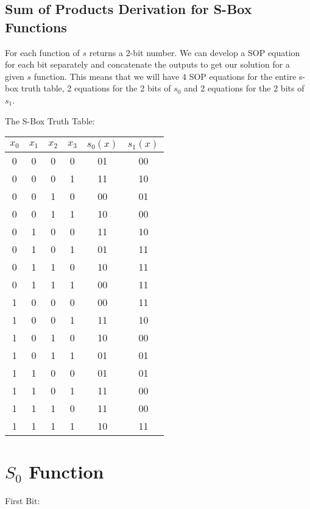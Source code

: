 \documentclass[12pt]{report}
\begin{document}
\begin{center} \section*{Sum of Products Derivation for S-Box Functions} \end{center}

For each function of $s$ returns a 2-bit number. We can develop a SOP equation for each bit separately and concatenate the outputs to get our solution for a given $s$ function. This means that we will have 4 SOP equations for the entire s-box truth table, 2 equations for the 2 bits of $s_0$ and 2 equations for the 2 bits of $s_1$.

The S-Box Truth Table:

\begin{tabular}{ |c|c|c|c|c|c| }
\hline
$x_0$ & $x_1$ & $x_2$ & $x_3$ & $s_0(x)$ & $s_1(x)$ \\
\hline
0 & 0 & 0 & 0 & 01 & 00 \\
0 & 0 & 0 & 1 & 11 & 10 \\
0 & 0 & 1 & 0 & 00 & 01 \\
0 & 0 & 1 & 1 & 10 & 00 \\
0 & 1 & 0 & 0 & 11 & 10 \\
0 & 1 & 0 & 1 & 01 & 11 \\
0 & 1 & 1 & 0 & 10 & 11 \\
0 & 1 & 1 & 1 & 00 & 11 \\
1 & 0 & 0 & 0 & 00 & 11 \\
1 & 0 & 0 & 1 & 11 & 10 \\
1 & 0 & 1 & 0 & 10 & 00 \\
1 & 0 & 1 & 1 & 01 & 01 \\
1 & 1 & 0 & 0 & 01 & 01 \\
1 & 1 & 0 & 1 & 11 & 00 \\
1 & 1 & 1 & 0 & 11 & 00 \\
1 & 1 & 1 & 1 & 10 & 11 \\
\hline
\end{tabular}

\section{$S_0$ Function}

First Bit:
\end{document}
